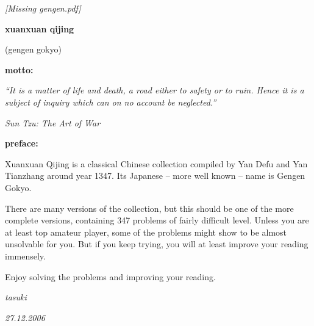 \documentclass[11pt]{book}
\begin{document}
\begin{titlepage}

    \vspace*{0.2\textheight}

    \begin{center}
        \textit{\large [Missing gengen.pdf]}
    \end{center}
    \begin{center}
        \textbf{\huge xuanxuan qijing}
    \end{center}
    \begin{center}
        {\large (gengen gokyo)}
    \end{center}

\end{titlepage}

\newpage %


\noindent\textbf{\Large motto:}

\medskip
\textit{\normalsize ``It is a matter of life and death, a road either to safety or to ruin. Hence it is a subject of inquiry which can on no account be neglected.''}

\medskip
\hfill {\it Sun Tzu: The Art of War}
\bigskip

\noindent\textbf{\Large preface:}

\medskip
{
\normalsize
Xuanxuan Qijing is a classical Chinese collection compiled by Yan Defu and Yan Tianzhang around year 1347. Its Japanese -- more well known -- name is Gengen Gokyo.

There are many versions of the collection, but this should be one of the more complete versions, containing 347 problems of fairly difficult level. Unless you are at least top amateur player, some of the problems might show to be almost unsolvable for you. But if you keep trying, you will at least improve your reading immensely.

Enjoy solving the problems and improving your reading.
}

\medskip
\hfill \textit{tasuki}

\hfill \textit{27.12.2006}

\newpage %


\begin{multicols}{2}
    
\end{multicols}
\end{document}
